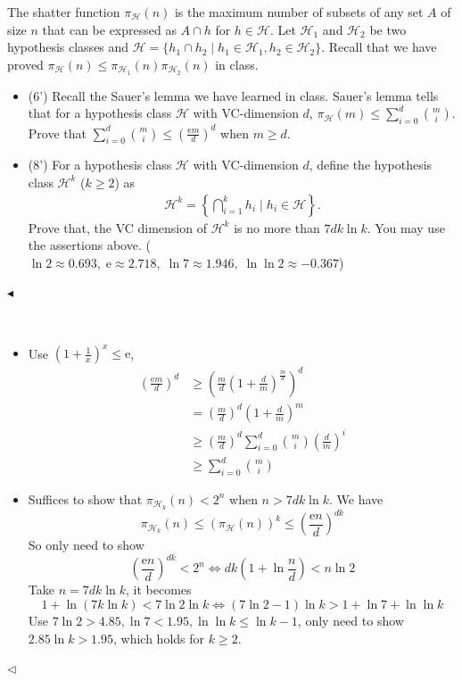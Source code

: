 \documentclass[11pt]{article}
\newenvironment{problem}[2][Problem]{\begin{trivlist}
\item[\hskip \labelsep {\bfseries #1}\hskip \labelsep {\bfseries #2.}]}{\hfill$\blacktriangleleft$\end{trivlist}}
\newenvironment{answer}[1][Answer]{\begin{trivlist}
\item[\hskip \labelsep {\bfseries #1.}\hskip \labelsep]}{\hfill$\lhd$\end{trivlist}}
\begin{document}
\begin{problem}{2 (14')} The shatter function $\pi_\mathcal{H}(n)$ is the maximum number of subsets of any set $A$ of size $n$ that can be expressed as $A\cap h$ for $h\in \mathcal{H}$. Let $\mathcal{H}_1$ and $\mathcal{H}_2$ be two hypothesis classes and $\mathcal{H}=\{h_1\cap h_2\mid h_1\in \mathcal{H}_1,h_2\in \mathcal{H}_2\}$. Recall that we have proved $\pi_\mathcal{H}(n)\leq\pi_{\mathcal{H}_1}(n)\pi_{\mathcal{H}_2}(n)$ in class. 

\begin{itemize}
    \item [(1)] (6') Recall the Sauer's lemma we have learned in class. Sauer's lemma tells that for a hypothesis class $\mathcal{H}$ with VC-dimension $d$, $\pi_\mathcal{H}(m)\leq\sum_{i=0}^d\binom{m}{i}$. Prove that $\sum_{i=0}^d\binom{m}{i}\leq\left(\frac{\mathrm{e}m}{d}\right)^d$ when $m\geq d$.
    \item [(2)] (8') For a hypothesis class $\mathcal{H}$ with VC-dimension $d$, define the hypothesis class $\mathcal{H}^k$ ($k\geq 2$) as
    \begin{align*}
        \mathcal{H}^k=\left\{\bigcap_{i=1}^k h_i\;\big|\; h_i\in \mathcal{H}\right\}.
    \end{align*}
    Prove that, the VC dimension of $\mathcal{H}^k$ is no more than $7dk\ln k$. You may use the assertions above. ($\ln 2\approx0.693,\;\mathrm{e}\approx2.718,\;\ln 7\approx 1.946,\;\ln\ln 2\approx-0.367$)
\end{itemize}
\end{problem}

\begin{answer} ~
    \begin{itemize}
        \item[(1)] Use $\left(1 + \frac{1}{x}\right)^x \le \mathrm{e}$, 
        \begin{align*}
            \left(\frac{\mathrm{e}m}{d}\right)^d &\ge \left(\frac{m}{d}\left(1 + \frac{d}{m}\right)^{\frac{m}{d}}\right)^d \\
            &= \left(\frac{m}{d}\right)^d \left(1 + \frac{d}{m}\right)^m \\
            &\ge \left(\frac{m}{d}\right)^d \sum_{i=0}^d \binom{m}{i}\left(\frac{d}{m}\right)^i \\
            &\ge \sum_{i=0}^d \binom{m}{i}
            \end{align*}

        \item[(2)] Suffices to show that $\pi_{\mathcal{H}_k}(n) < 2^n$ when $n > 7dk\ln k$. We have
        \[\pi_{\mathcal{H}_k}(n) \le \left(\pi_{\mathcal{H}}(n)\right)^k \le \left(\frac{\mathrm{e}n}{d}\right)^{dk}\]
        So only need to show
        \[\left(\frac{\mathrm{e}n}{d}\right)^{dk} < 2^n \Longleftrightarrow dk\left(1 + \ln\frac{n}{d}\right) < n \ln 2\]
        Take $n = 7dk\ln k$, it becomes
        \[1 + \ln (7k \ln k) < 7\ln 2\ln k \Longleftrightarrow (7\ln 2 - 1)\ln k > 1 + \ln 7 + \ln\ln k \]
        Use $7\ln 2 > 4.85, \ln 7 < 1.95, \ln\ln k \le \ln k - 1$, only need to show $2.85\ln k > 1.95$, which holds for $k \ge 2$.
    \end{itemize}
\end{answer}
\end{document}
